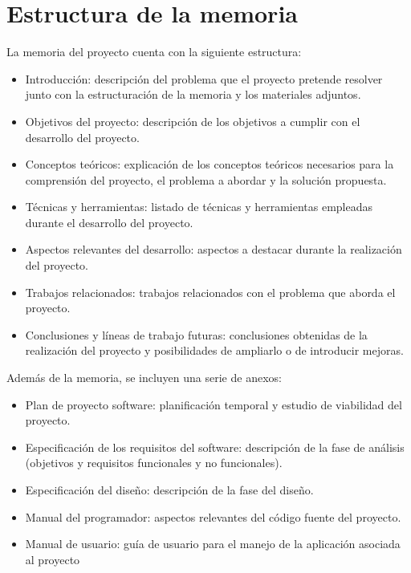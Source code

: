 \section{Estructura de la memoria}
La memoria del proyecto cuenta con la siguiente estructura:
\begin{itemize}
    \item Introducción: descripción del problema que el proyecto pretende resolver junto con la estructuración 
        de la memoria y los materiales adjuntos.
    \item Objetivos del proyecto: descripción de los objetivos a cumplir con el desarrollo del proyecto.
    \item Conceptos teóricos: explicación de los conceptos teóricos necesarios para la comprensión del proyecto, 
        el problema a abordar y la solución propuesta.
    \item Técnicas y herramientas: listado de técnicas y herramientas empleadas durante el desarrollo del proyecto.
    \item Aspectos relevantes del desarrollo: aspectos a destacar durante la realización del proyecto.
    \item Trabajos relacionados: trabajos relacionados con el problema que aborda el proyecto.
    \item Conclusiones y líneas de trabajo futuras: conclusiones obtenidas de la realización del proyecto y posibilidades
        de ampliarlo o de introducir mejoras.
\end{itemize}

Además de la memoria, se incluyen una serie de anexos:
\begin{itemize}
    \item Plan de proyecto software: planificación temporal y estudio de viabilidad del proyecto.
    \item Especificación de los requisitos del software: descripción de la fase de análisis (objetivos y requisitos funcionales y no funcionales).
    \item Especificación del diseño: descripción de la fase del diseño.
    \item Manual del programador: aspectos relevantes del código fuente del proyecto.
    \item Manual de usuario: guía de usuario para el manejo de la aplicación asociada al proyecto
\end{itemize}



